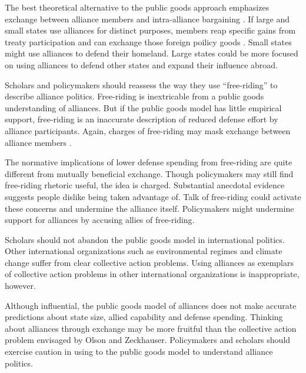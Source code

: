 \documentclass[12pt]{article}
\begin{document}
The best theoretical alternative to the public goods approach emphasizes exchange between alliance members and intra-alliance bargaining \citep{Norrlof2010, Brooksetal2013, Kim2016}. 
If large and small states use alliances for distinct purposes, members reap specific gains from treaty participation and can exchange those foreign poilicy goods \citep{Morrow1991, Johnson2015}. 
Small states might use alliances to defend their homeland. 
Large states could be more focused on using alliances to defend other states and expand their influence abroad. 


Scholars and policymakers should reassess the way they use ``free-riding'' to describe alliance politics. 
Free-riding is inextricable from a public goods understanding of alliances.
But if the public goods model has little empirical support, free-riding is an inaccurate description of reduced defense effort by alliance participants.  
Again, charges of free-riding may mask exchange between alliance members \citep{Lanoszka2015}. 


The normative implications of lower defense spending from free-riding are quite different from mutually beneficial exchange. 
Though policymakers may still find free-riding rhetoric useful, the idea is charged. 
Substantial anecdotal evidence suggests people dislike being taken advantage of. 
Talk of free-riding could activate these concerns and undermine the alliance itself.
Policymakers might undermine support for alliances by accusing allies of free-riding. 


Scholars should not abandon the public goods model in international politics. 
Other international organizations such as environmental regimes and climate change suffer from clear collective action problems.  
Using alliances as exemplars of collective action problems in other international organizations is inappropriate, however. 


Although influential, the public goods model of alliances does not make accurate predictions about state size, allied capability and defense spending. 
Thinking about alliances through exchange may be more fruitful than the collective action problem envisaged by Olson and Zeckhauser.
Policymakers and scholars should exercise caution in using to the public goods model to understand alliance politics.  



\singlespace


 
\end{document}
